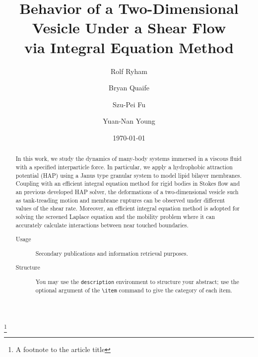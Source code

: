 \documentclass[%
 reprint,
 amsmath,amssymb,
 aps,
]{revtex4-2}
\begin{document}

\title{Behavior of a Two-Dimensional Vesicle Under a Shear Flow \\via Integral Equation Method}
\thanks{A footnote to the article title}%

\author{Rolf Ryham}
\author{Bryan Quaife}%
%


\author{Szu-Pei Fu}
\author{Yuan-Nan Young}
%


\date{\today}%

\begin{abstract}
In this work, we study the dynamics of many-body systems immersed in a viscous fluid with a specified interparticle force. In particular, we apply a hydrophobic attraction potential (HAP) using a Janus type granular system to model lipid bilayer membranes. Coupling with an efficient integral equation method for rigid bodies in Stokes flow and an previous developed HAP solver, the deformations of a two-dimensional vesicle such as tank-treading motion and membrane ruptures can be observed under different values of the shear rate. Moreover, an efficient integral equation method is adopted for solving the screened Laplace equation and the mobility problem where it can accurately calculate interactions between near touched boundaries.
\begin{description}
\item[Usage]
Secondary publications and information retrieval purposes.
\item[Structure]
You may use the \texttt{description} environment to structure your abstract;
use the optional argument of the \verb+\item+ command to give the category of each item. 
\end{description}
\end{abstract}
\end{document}
